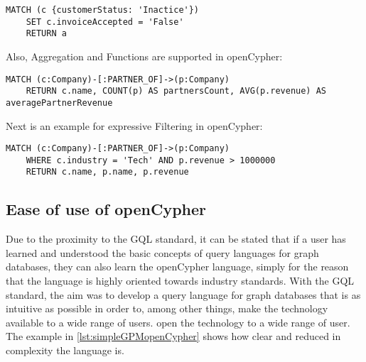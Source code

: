 \begin{lstlisting}[caption={Graph Pattern Matching in openCypher}, label={lst:simpleGPMOC}] 
	MATCH (c {customerStatus: 'Inactice'})
	SET c.invoiceAccepted = 'False'
	RETURN a
\end{lstlisting}


Also, Aggregation and Functions are supported in openCypher:
\begin{lstlisting}[caption={Aggregation and Functions in openCypher}, label={lst:aggregationFunctionsOC}]
	MATCH (c:Company)-[:PARTNER_OF]->(p:Company)
	RETURN c.name, COUNT(p) AS partnersCount, AVG(p.revenue) AS averagePartnerRevenue
\end{lstlisting}
Next is an example for expressive Filtering in openCypher:
\begin{lstlisting}[caption={Expressive Filtering in openCypher with Company Nodes}, label={lst:companyExpressiveFilteringOC}]
	MATCH (c:Company)-[:PARTNER_OF]->(p:Company)
	WHERE c.industry = 'Tech' AND p.revenue > 1000000
	RETURN c.name, p.name, p.revenue
\end{lstlisting}

\subsection{Ease of use of openCypher}
\label{subsec:different_query_languages_for_graph_databases:openCypher:ease_of_use}
Due to the proximity to the GQL standard, it can be stated that if a user has learned 
and understood the basic concepts of query languages for graph databases, 
they can also learn the openCypher language, 
simply for the reason that the language is highly oriented towards industry standards.
With the GQL standard, the aim was to develop a query language for graph databases that is as intuitive as possible in order to, among other things, make the technology available to a wide range of users. 
open the technology to a wide range of user.
The example in \cref{lst:simpleGPMopenCypher} shows how clear and reduced in complexity the language is.


